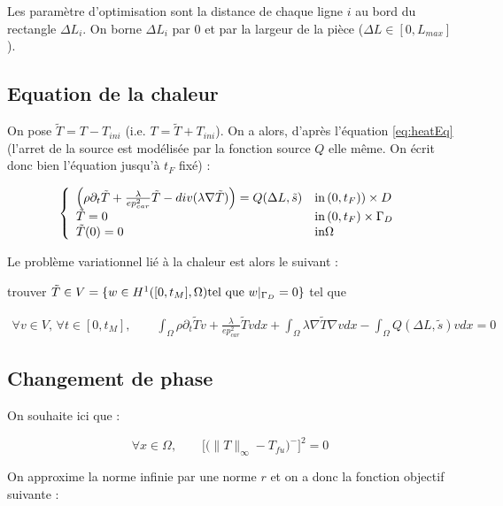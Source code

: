 \documentclass[11pt,a4paper]{article}
\begin{document}
Les paramètre d'optimisation sont la distance de chaque ligne $i$ au bord du rectangle $\Delta L_i$. On borne $\Delta L_i$ par 0 et par la largeur de la pièce ($\Delta L\in[0,L_{max}]$). 
 
\subsection*{Equation de la chaleur}

On pose $\tilde{T}=T-T_{ini}$ (i.e. $T=\tilde{T}+T_{ini}$). On a alors, d'après l'équation \ref{eq:heatEq} (l'arret de la source est modélisée par la fonction source $Q$ elle même. On écrit donc bien l'équation jusqu'à $t_F$ fixé) :

\begin{equation}
\label{eq:ChaleurTilde}
\left\{\begin{array}{ll}
\Big(\rho\partial_t \tilde{T}+\frac{\lambda}{ep_{car}^2} \tilde{T}-div(\lambda\nabla \tilde{T})\Big)=Q(\Delta L,\tilde{s})& \textrm{in\,}(0,t_F))\times D \\
\tilde{T}=0 & \textrm{in\,}(0,t_F)\times \Gamma_D \\
\tilde{T}(0)=0 & \textrm{in} \Omega
\end{array}\right.
\end{equation}




Le problème variationnel lié à la chaleur est alors le suivant :

trouver $\tilde{T}\in V=\{w\in H^1([0,t_M],\Omega) \textrm{tel\,\,que} \,\,w|_{\Gamma_D}=0\}$ tel que

\begin{equation}
\label{eq:pbVarChaleurTF}
\begin{aligned}
\forall v\in V,\,\forall t\in[0,t_M], \qquad\int_{\Omega}\rho\partial_t \tilde{T}v+\frac{\lambda}{ep_{car}^2} \tilde{T}v dx+\int_{\Omega}\lambda\nabla \tilde{T}\nabla vdx-\int_{\Omega}Q(\Delta L,\tilde{s})vdx=0
\end{aligned} 
\end{equation}

\subsection*{Changement de phase}
On souhaite ici que :

\begin{equation}
\forall x\in\Omega,\qquad \Big[\Big(\|T\|_{\infty}-T_{fu}\Big)^-\Big]^2=0
\end{equation}

On approxime la norme infinie par une norme $r$ et on a donc la fonction objectif suivante :
\end{document}
